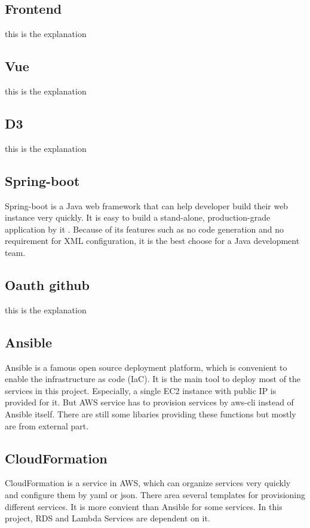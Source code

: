 \documentclass[conference]{IEEEtran}
\begin{document}
\subsection{Frontend}
this is the explanation

\subsection{Vue}
this is the explanation

\subsection{D3}
this is the explanation
 
\subsection{Spring-boot}
Spring-boot is a Java web framework that can help developer build their web instance very quickly. It is easy to build a 
stand-alone, production-grade application by it \cite{SpringBo66:online}. Because of its features such as no code generation 
and no requirement for XML configuration, it is the best choose for a Java development team.

\subsection{Oauth github}
this is the explanation

\subsection{Ansible}
Ansible is a famous open source deployment platform, which is convenient to enable the infrastructure as code (IaC). 
It is the main tool to deploy most of the services in this project. Especially, a single EC2 instance with public 
IP is provided for it. But AWS service has to provision services by aws-cli instead of Ansible itself. There are still 
some libaries providing these functions but mostly are from external part.

\subsection{CloudFormation}
CloudFormation is a service in AWS, which can organize services very quickly and configure them by yaml or json. There area
several templates for provisioning different services. It is more convient than Ansible for some services. In this project, 
RDS and Lambda Services are dependent on it.
\end{document}

